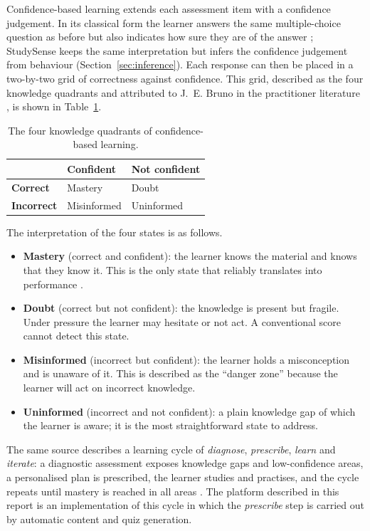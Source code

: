\documentclass[12pt,a4paper,oneside]{report}
\begin{document}
Confidence-based learning extends each assessment item with a
confidence judgement. In its classical form the learner answers the same
multiple-choice question as before but also indicates how sure they are of
the answer \cite{benchprep}; StudySense keeps the same interpretation but
infers the confidence judgement from behaviour
(Section~\ref{sec:inference}). Each response can then be placed in a two-by-two grid of
correctness against confidence. This grid, described as the four
knowledge quadrants and attributed to J.~E. Bruno in the practitioner
literature \cite{benchprep}, is shown in Table~\ref{tab:quadrants}.

\begin{table}[H]
\centering
\caption{The four knowledge quadrants of confidence-based learning.}
\label{tab:quadrants}
\begin{tabular}{@{}lll@{}}
\toprule
 & \textbf{Confident} & \textbf{Not confident} \\
\midrule
\textbf{Correct}   & Mastery     & Doubt \\
\textbf{Incorrect} & Misinformed & Uninformed \\
\bottomrule
\end{tabular}
\end{table}

The interpretation of the four states is as follows.
\begin{itemize}
  \item \textbf{Mastery} (correct and confident): the learner knows the
        material and knows that they know it. This is the only state that
        reliably translates into performance \cite{benchprep}.
  \item \textbf{Doubt} (correct but not confident): the knowledge is
        present but fragile. Under pressure the learner may hesitate or not
        act. A conventional score cannot detect this state.
  \item \textbf{Misinformed} (incorrect but confident): the learner holds a
        misconception and is unaware of it. This is described as the
        ``danger zone'' because the learner will act on incorrect knowledge.
  \item \textbf{Uninformed} (incorrect and not confident): a plain knowledge
        gap of which the learner is aware; it is the most straightforward
        state to address.
\end{itemize}

The same source describes a learning cycle of \emph{diagnose},
\emph{prescribe}, \emph{learn} and \emph{iterate}: a diagnostic assessment
exposes knowledge gaps and low-confidence areas, a personalised plan is
prescribed, the learner studies and practises, and the cycle repeats until
mastery is reached in all areas \cite{benchprep}. The platform described in
this report is an implementation of this cycle in which the
\emph{prescribe} step is carried out by automatic content and quiz
generation.
\end{document}
